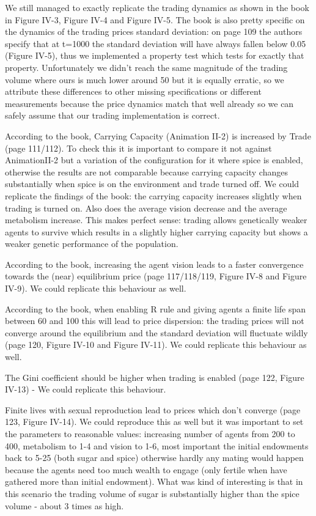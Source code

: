 We still managed to exactly replicate the trading dynamics as shown in the book in Figure IV-3, Figure IV-4 and Figure IV-5. The book is also pretty specific on the dynamics of the trading prices standard deviation: on page 109 the authors specify that at t=1000 the standard deviation will have always fallen below 0.05 (Figure IV-5), thus we implemented a property test which tests for exactly that property. Unfortunately we didn't reach the same magnitude of the trading volume where ours is much lower around 50 but it is equally erratic, so we attribute these differences to other missing specifications or different measurements because the price dynamics match that well already so we can safely assume that our trading implementation is correct.

According to the book, Carrying Capacity (Animation II-2) is increased by Trade (page 111/112). To check this it is important to compare it not against AnimationII-2 but a variation of the configuration for it where spice is enabled, otherwise the results are not comparable because carrying capacity changes substantially when spice is on the environment and trade turned off. We could replicate the findings of the book: the carrying capacity increases slightly when trading is turned on. Also does the average vision decrease and the average metabolism increase. This makes perfect sense: trading allows genetically weaker agents to survive which results in a slightly higher carrying capacity but shows a weaker genetic performance of the population.

According to the book, increasing the agent vision leads to a faster convergence towards the (near) equilibrium price (page 117/118/119, Figure IV-8 and Figure IV-9). We could replicate this behaviour as well.

According to the book, when enabling R rule and giving agents a finite life span between 60 and 100 this will lead to price dispersion: the trading prices will not converge around the equilibrium and the standard deviation will fluctuate wildly (page 120, Figure IV-10 and Figure IV-11). We could replicate this behaviour as well.

The Gini coefficient should be higher when trading is enabled (page 122, Figure IV-13) - We could replicate this behaviour.

Finite lives with sexual reproduction lead to prices which don't converge (page 123, Figure IV-14). We could reproduce this as well but it was important to set the parameters to reasonable values: increasing number of agents from 200 to 400, metabolism to 1-4 and vision to 1-6, most important the initial endowments back to 5-25 (both sugar and spice) otherwise hardly any mating would happen because the agents need too much wealth to engage (only fertile when have gathered more than initial endowment). What was kind of interesting is that in this scenario the trading volume of sugar is substantially higher than the spice volume - about 3 times as high. 

